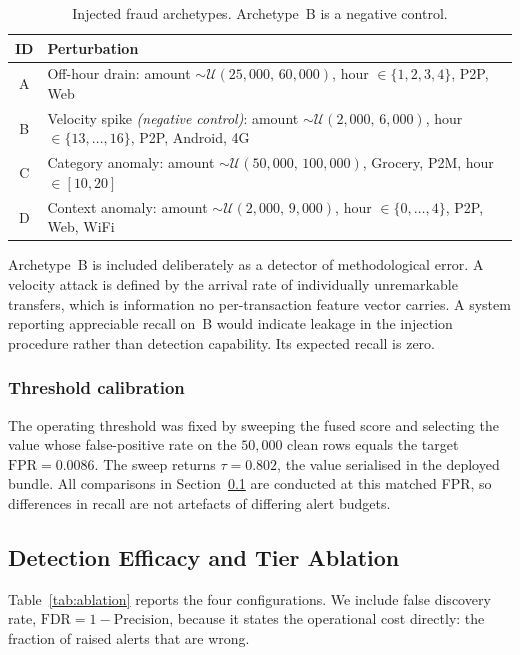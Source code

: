 \documentclass[conference]{IEEEtran}
\begin{document}
\begin{table}[t]
\centering
\caption{Injected fraud archetypes. Archetype~B is a negative control.}
\label{tab:archetypes}
\renewcommand{\arraystretch}{1.2}
\footnotesize
\begin{tabular}{@{}cp{}@{}}
\toprule
\textbf{ID} & \textbf{Perturbation} \\
\midrule
A & Off-hour drain: amount $\sim\mathcal{U}(25{,}000,\,60{,}000)$, hour $\in\{1,2,3,4\}$, P2P, Web \\
B & Velocity spike \emph{(negative control)}: amount $\sim\mathcal{U}(2{,}000,\,6{,}000)$, hour $\in\{13,\dots,16\}$, P2P, Android, 4G \\
C & Category anomaly: amount $\sim\mathcal{U}(50{,}000,\,100{,}000)$, Grocery, P2M, hour $\in[10,20]$ \\
D & Context anomaly: amount $\sim\mathcal{U}(2{,}000,\,9{,}000)$, hour $\in\{0,\dots,4\}$, P2P, Web, WiFi \\
\bottomrule
\end{tabular}
\end{table}

Archetype~B is included deliberately as a detector of methodological
error. A velocity attack is defined by the arrival rate of
individually unremarkable transfers, which is information no
per-transaction feature vector carries. A system reporting appreciable
recall on~B would indicate leakage in the injection procedure rather
than detection capability. Its expected recall is zero.

\subsubsection{Threshold calibration}
The operating threshold was fixed by sweeping the fused score and
selecting the value whose false-positive rate on the $50{,}000$ clean
rows equals the target $\mathrm{FPR}=0.0086$. The sweep returns
$\tau = 0.802$, the value serialised in the deployed bundle. All
comparisons in Section~\ref{subsec:ablation} are conducted at this
matched FPR, so differences in recall are not artefacts of differing
alert budgets.

\subsection{Detection Efficacy and Tier Ablation}
\label{subsec:ablation}

Table~\ref{tab:ablation} reports the four configurations. We include
false discovery rate, $\mathrm{FDR} = 1 - \mathrm{Precision}$, because
it states the operational cost directly: the fraction of raised alerts
that are wrong.
\end{document}
